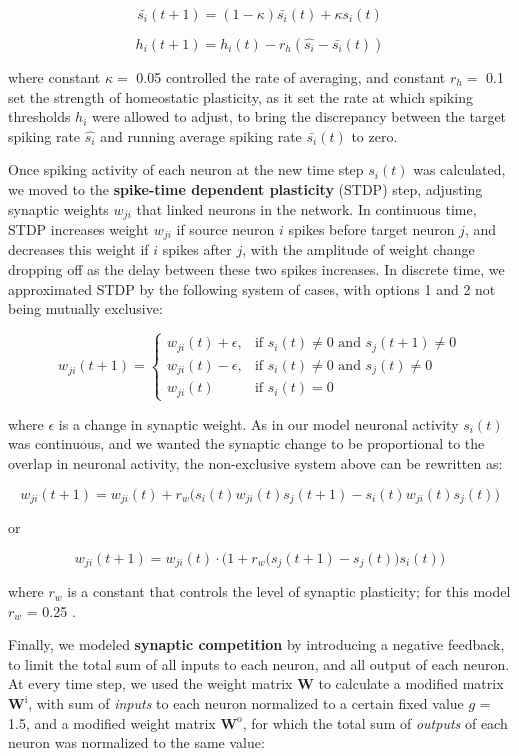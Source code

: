 \documentclass{article}
\begin{document}
\[ \bar{s_i}(t+1) = (1-\kappa)\bar{s_i}(t) + \kappa s_i(t) \]

\[ h_i(t+1) = h_i(t) - r_h(\hat{s_i} - \bar{s_i}(t)) \]

where constant $\kappa=$ 0.05 controlled the rate of averaging, and constant $r_h=$ 0.1 set the strength of homeostatic plasticity, as it set the rate at which spiking thresholds $h_i$ were allowed to adjust, to bring the discrepancy between the target spiking rate $\hat{s_i}$ and running average spiking rate $\bar{s_i}(t)$ to zero.

Once spiking activity of each neuron at the new time step $s_i(t)$ was calculated, we moved to the \textbf{spike-time dependent plasticity} (STDP) step, adjusting synaptic weights $w_{ji}$ that linked neurons in the network. In continuous time, STDP increases weight $w_{ji}$ if source neuron $i$ spikes before target neuron $j$, and decreases this weight if $i$ spikes after $j$, with the amplitude of weight change dropping off as the delay between these two spikes increases. In discrete time, we approximated STDP by the following system of cases, with options 1 and 2 not being mutually exclusive:


\[ w_{ji}(t+1) = \left \{ \begin{array}{lll} w_{ji}(t)+\epsilon, & \text{if } s_i(t)\neq 0 \text{ and } s_j(t+1)\neq 0 \\ w_{ji}(t)-\epsilon, & \text{if } s_i(t)\neq 0 \text{ and } s_j(t)\neq 0 \\ w_{ji}(t) & \text{if } s_i(t)=0\end{array} \right. \]

where $\epsilon$ is a change in synaptic weight. As in our model neuronal activity $s_i(t)$ was continuous, and we wanted the synaptic change to be proportional to the overlap in neuronal activity, the non-exclusive system above can be rewritten as:

\[ w_{ji}(t+1) = w_{ji}(t) + r_w \big(s_i(t)w_{ji}(t)s_j(t+1) - s_i(t)w_{ji}(t)s_j(t)\big) \]

or

\[ w_{ji}(t+1) = w_{ji}(t)\cdot\Big(1+r_w\big(s_j(t+1)-s_j(t)\big)s_i(t)\Big) \]

where $r_w$ is a constant that controls the level of synaptic plasticity; for this model $r_w$ = 0.25 .

Finally, we modeled \textbf{synaptic competition} by introducing a negative feedback, to limit the total sum of all inputs to each neuron, and all output of each neuron. At every time step, we used the weight matrix $\textbf{W}$ to calculate a modified matrix $\textbf{W}^\text{i}$, with sum of \textit{inputs} to each neuron normalized to a certain fixed value $g$ = 1.5, and a modified weight matrix $\textbf{W}^\text{o}$, for which the total sum of \textit{outputs} of each neuron was normalized to the same value: 
\end{document}
